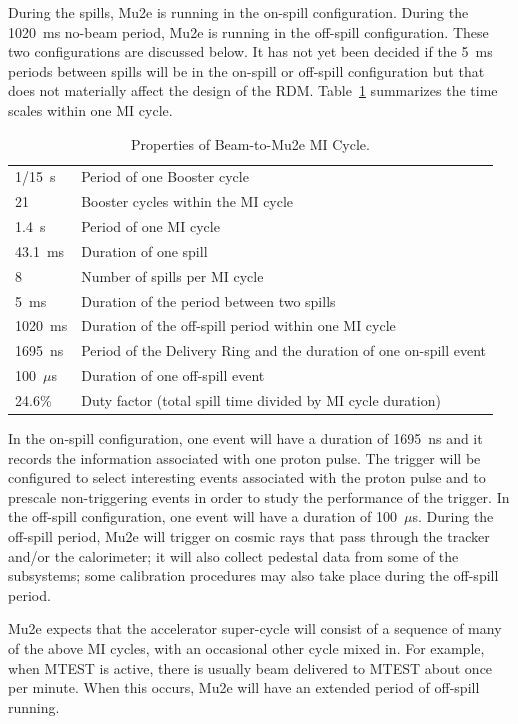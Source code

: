 During the spills, Mu2e is running in the on-spill configuration.
During the 1020~ms no-beam period, Mu2e is running in the off-spill configuration.
These two configurations are discussed below.
It has not yet been decided if the 5~ms periods between spills will
be in the on-spill or off-spill configuration
but that does not materially affect the design of the RDM.
Table~\ref{tab:timescales} summarizes the time scales within one MI cycle.
\begin{table}
\begin{center}
\caption[Properties of the Beam-to-Mu2e MI Cycle]{Properties of Beam-to-Mu2e MI Cycle.}
\label{tab:timescales}
\begin{tabular}{ll}\hline
   1/15~s & Period of one Booster cycle \\
   21     & Booster cycles within the MI cycle \\
   1.4~s  & Period of one MI cycle \\
   43.1~ms & Duration of one spill \\
   8       & Number of spills per MI cycle \\
    5~ms   & Duration of the period between two spills \\
   1020~ms & Duration of the off-spill period within one MI cycle \\
   1695~ns & Period of the Delivery Ring and the duration of one on-spill event\\
   100~$\mu$s & Duration of one off-spill event \\
   24.6\%     & Duty factor (total spill time divided by MI cycle duration)\\
   \hline
  \end{tabular}
\end{center}
\end{table}


In the on-spill configuration, one event will have  a duration of 1695~ns
and it records the information associated with one proton pulse.
The trigger will be configured to select interesting events associated with the proton pulse
and to prescale non-triggering events in order to study the performance of the trigger.
In the off-spill configuration, one event will have a duration of 100~$\mu$s.
During the off-spill period, Mu2e will trigger on cosmic rays that
pass through the tracker and/or the calorimeter; it will also collect
pedestal data from some of the subsystems; some calibration procedures
may also take place during the off-spill period.

Mu2e expects that the accelerator super-cycle will consist of a
sequence of many of the above MI cycles,
with an occasional other cycle mixed in.
For example, when MTEST is active, there is usually beam delivered to MTEST about once per minute.
When this occurs, Mu2e will have an extended period of off-spill running.

